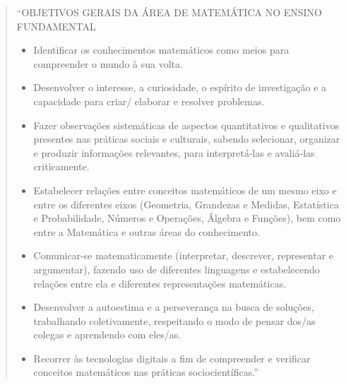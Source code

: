 \documentclass[10 pt]{article}
\begin{document}



%
 \blockquote{``OBJETIVOS GERAIS DA ÁREA DE MATEMÁTICA NO ENSINO FUNDAMENTAL \label{objetivosBNC}
\begin{itemize}
 \item Identificar os conhecimentos matemáticos como meios para compreender o mundo à sua volta.
 \item Desenvolver o interesse, a curiosidade, o espírito de investigação e a capacidade para criar/ elaborar e resolver problemas.
 \item Fazer observações sistemáticas de aspectos quantitativos e qualitativos presentes nas práticas sociais e culturais, sabendo selecionar, organizar e produzir informações relevantes, para interpretá-las e avaliá-las criticamente.
 \item Estabelecer relações entre conceitos matemáticos de um mesmo eixo e entre os diferentes eixos (Geometria, Grandezas e Medidas, Estatística e Probabilidade, Números e Operações, Álgebra e Funções), bem como entre a Matemática e outras áreas do conhecimento.
 \item Comunicar-se matematicamente (interpretar, descrever, representar e argumentar), fazendo uso de diferentes linguagens e estabelecendo relações entre ela e diferentes representações matemáticas.
 \item Desenvolver a autoestima e a perseverança na busca de soluções, trabalhando coletivamente, respeitando o modo de pensar dos/as colegas e aprendendo com eles/as.
 \item Recorrer às tecnologias digitais a fim de compreender e verificar conceitos matemáticos nas práticas sociocientíficas.''
\end{itemize}}
\end{document}
